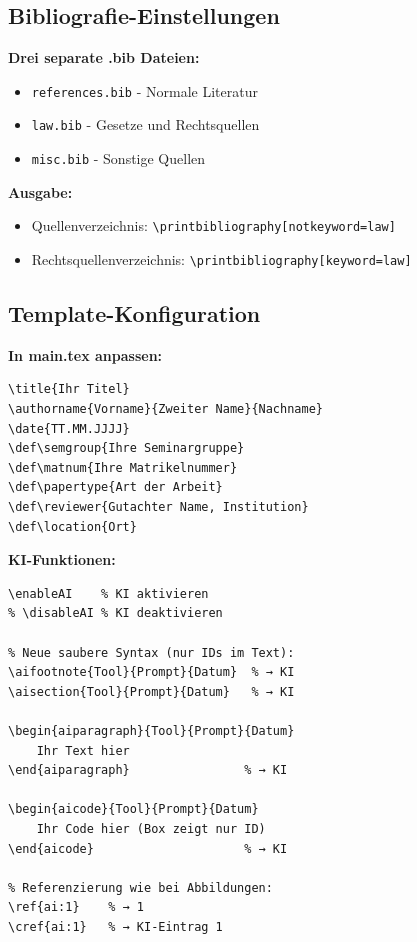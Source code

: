 \documentclass[../main.tex]{subfiles}
\begin{document}

\subsection{Bibliografie-Einstellungen}

\textbf{Drei separate .bib Dateien:}
\begin{itemize}
    \item \verb|references.bib| - Normale Literatur
    \item \verb|law.bib| - Gesetze und Rechtsquellen  
    \item \verb|misc.bib| - Sonstige Quellen
\end{itemize}

\textbf{Ausgabe:}
\begin{itemize}
    \item Quellenverzeichnis: \verb|\printbibliography[notkeyword=law]|
    \item Rechtsquellenverzeichnis: \verb|\printbibliography[keyword=law]|
\end{itemize}


\subsection{Template-Konfiguration}

\textbf{In main.tex anpassen:}
\begin{verbatim}
\title{Ihr Titel}
\authorname{Vorname}{Zweiter Name}{Nachname}
\date{TT.MM.JJJJ}
\def\semgroup{Ihre Seminargruppe}
\def\matnum{Ihre Matrikelnummer}
\def\papertype{Art der Arbeit}
\def\reviewer{Gutachter Name, Institution}
\def\location{Ort}
\end{verbatim}

\textbf{KI-Funktionen:}
\begin{verbatim}
\enableAI    % KI aktivieren
% \disableAI % KI deaktivieren

% Neue saubere Syntax (nur IDs im Text):
\aifootnote{Tool}{Prompt}{Datum}  % → KI
\aisection{Tool}{Prompt}{Datum}   % → KI

\begin{aiparagraph}{Tool}{Prompt}{Datum}
    Ihr Text hier
\end{aiparagraph}                % → KI

\begin{aicode}{Tool}{Prompt}{Datum}
    Ihr Code hier (Box zeigt nur ID)
\end{aicode}                     % → KI

% Referenzierung wie bei Abbildungen:
\ref{ai:1}    % → 1
\cref{ai:1}   % → KI-Eintrag 1
\end{verbatim}
\end{document}
